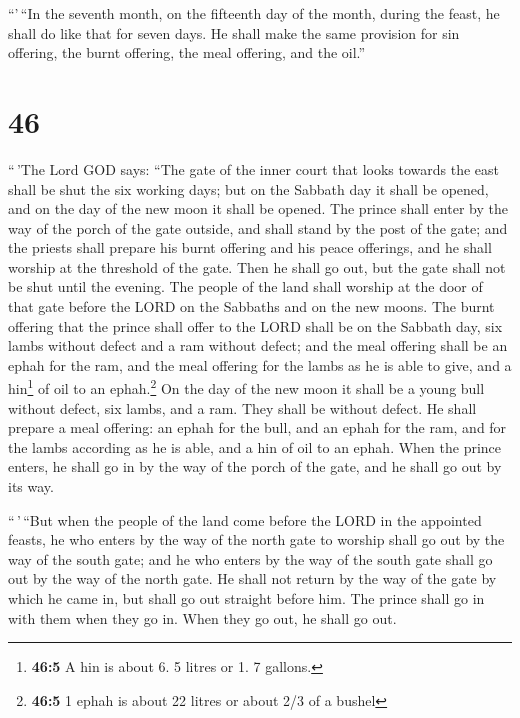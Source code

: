  ``'\,``In the seventh month, on the fifteenth day of the
month, during the feast, he shall do like that for seven days. He shall
make the same provision for sin offering, the burnt offering, the meal
offering, and the oil.''

\hypertarget{section-44}{%
\section{46}\label{section-44}}

 ``\,'The Lord GOD says: ``The gate of the inner court
that looks towards the east shall be shut the six working days; but on
the Sabbath day it shall be opened, and on the day of the new moon it
shall be opened.  The prince shall enter by the way of the
porch of the gate outside, and shall stand by the post of the gate; and
the priests shall prepare his burnt offering and his peace offerings,
and he shall worship at the threshold of the gate. Then he shall go out,
but the gate shall not be shut until the evening.  The
people of the land shall worship at the door of that gate before the
LORD on the Sabbaths and on the new moons.  The burnt
offering that the prince shall offer to the LORD shall be on the Sabbath
day, six lambs without defect and a ram without defect; 
and the meal offering shall be an ephah for the ram, and the meal
offering for the lambs as he is able to give, and a hin\footnote{\textbf{46:5}
  A hin is about 6. 5 litres or 1. 7 gallons.} of oil to an
ephah.\footnote{\textbf{46:5} 1 ephah is about 22 litres or about 2/3 of
  a bushel}  On the day of the new moon it shall be a
young bull without defect, six lambs, and a ram. They shall be without
defect.  He shall prepare a meal offering: an ephah for
the bull, and an ephah for the ram, and for the lambs according as he is
able, and a hin of oil to an ephah.  When the prince
enters, he shall go in by the way of the porch of the gate, and he shall
go out by its way.

 ``\,'\,``But when the people of the land come before the
LORD in the appointed feasts, he who enters by the way of the north gate
to worship shall go out by the way of the south gate; and he who enters
by the way of the south gate shall go out by the way of the north gate.
He shall not return by the way of the gate by which he came in, but
shall go out straight before him.  The prince shall go in
with them when they go in. When they go out, he shall go out.

